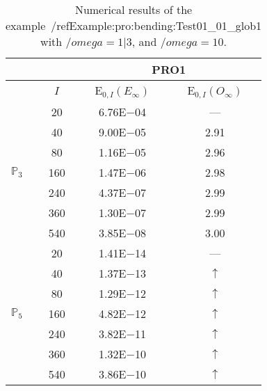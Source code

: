 \begin{table}[H]
\caption{Numerical results of the example~/ref{Example:pro:bending:Test01_01_glob1} with $/omega=1|3$, and $/omega=10$.}
\setlength{\tabcolsep}{5pt}
\centering
\begin{tabular}{@{}l c c c@{}}
\toprule
 &  & \multicolumn{2}{c}{PRO1}\\
\midrule
 & $I$ & E$_{0,I}(E_{\infty})$ & E$_{0,I}(O_{\infty})$\\
\midrule
\multirow{7}{*}{$\mathbb{P}_{3}$}
 & 20 & 6.76E$-$04 & ---\\
 & 40 & 9.00E$-$05 & 2.91\\
 & 80 & 1.16E$-$05 & 2.96\\
 & 160 & 1.47E$-$06 & 2.98\\
 & 240 & 4.37E$-$07 & 2.99\\
 & 360 & 1.30E$-$07 & 2.99\\
 & 540 & 3.85E$-$08 & 3.00\\
\midrule
\multirow{7}{*}{$\mathbb{P}_{5}$}
 & 20 & 1.41E$-$14 & ---\\
 & 40 & 1.37E$-$13 & $\uparrow$\\
 & 80 & 1.29E$-$12 & $\uparrow$\\
 & 160 & 4.82E$-$12 & $\uparrow$\\
 & 240 & 3.82E$-$11 & $\uparrow$\\
 & 360 & 1.32E$-$10 & $\uparrow$\\
 & 540 & 3.86E$-$10 & $\uparrow$\\
\bottomrule
\end{tabular}
\label{Table:pRO:test_01_01_test12_pro3}
\end{table}
